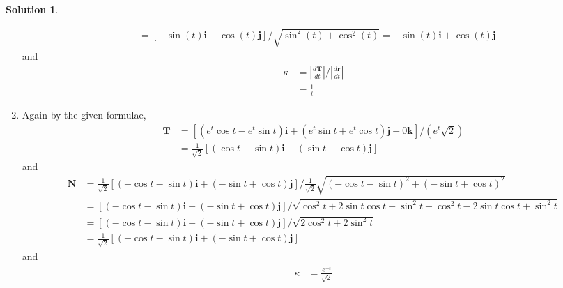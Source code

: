 \documentclass[10pt]{article}
\theoremstyle{definition}
\newtheorem{soln}{Solution}
\newcommand{\ui}{\mathbf{i}}
\newcommand{\uj}{\mathbf{j}}
\newcommand{\uk}{\mathbf{k}}
\begin{document}
\begin{soln}
\begin{enumerate}[label=(\alph*)]
\begin{align*}
                       & =\left[-\sin (t)\ui+\cos (t)\uj\right]/\sqrt{\sin^2 (t)+\cos^2 (t)}=-\sin (t)\ui+\cos (t)\uj
          \end{align*}
          and
          \begin{align*}
            \kappa & = \left|\frac{d\mathbf{T}}{dt}\right|/\left|\frac{d\mathbf{r}}{dt}\right| \\
                   & = \frac{1}{t}
          \end{align*}
    \item Again by the given formulae,
          \begin{align*}
            \mathbf{T} & =\left[\left(e^t\cos{t}-e^t\sin{t}\right)\ui+\left(e^t\sin{t}+e^t\cos{t}\right)\uj+0\uk\right]/(e^t\sqrt{2}) \\
                       & =\frac{1}{\sqrt{2}}\left[\left(\cos{t}-\sin{t}\right)\ui+\left(\sin{t}+\cos{t}\right)\uj\right]
          \end{align*}
          and
          \begin{align*}
            \mathbf{N} & =\frac{1}{\sqrt{2}}\left[\left(-\cos{t}-\sin{t}\right)\ui+\left(-\sin{t}+\cos{t}\right)\uj\right]/\frac{1}{\sqrt{2}}\sqrt{\left(-\cos{t}-\sin{t}\right)^2+\left(-\sin{t}+\cos{t}\right)^2} \\
                       & =\left[\left(-\cos{t}-\sin{t}\right)\ui+\left(-\sin{t}+\cos{t}\right)\uj\right]/\sqrt{\cos^2{t}+2\sin{t}\cos{t}+\sin^2{t}+\cos^2{t}-2\sin{t}\cos{t}+\sin^2{t}}                             \\
                       & =\left[\left(-\cos{t}-\sin{t}\right)\ui+\left(-\sin{t}+\cos{t}\right)\uj\right]/\sqrt{2\cos^2{t}+2\sin^2{t}}                                                                               \\
                       & =\frac{1}{\sqrt{2}}\left[\left(-\cos{t}-\sin{t}\right)\ui+\left(-\sin{t}+\cos{t}\right)\uj\right]
          \end{align*}
          and
          \begin{align*}
            \kappa & = \frac{e^{-t}}{\sqrt{2}}
          \end{align*}
  \end{enumerate}
\end{soln}
\end{document}
